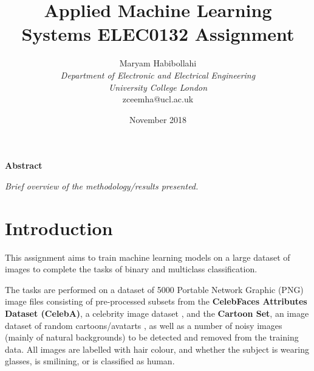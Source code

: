 \documentclass[conference]{IEEEtran}
\begin{document}
\title{Applied Machine Learning\\
 Systems ELEC0132 Assignment}
\author{\large Maryam Habibollahi\\ \textit{Department of Electronic and Electrical Engineering}\\ \textit{University College London}\\ zceemha@ucl.ac.uk}
\date{November 2018}
\maketitle

\setcounter{page}{1} 

\begin{center} \large \textbf{Abstract} \end{center}
\textit{Brief overview of the methodology/results presented.}\\

\section{Introduction} \label{s-intro}


This assignment aims to train machine learning models on a large dataset of images to complete the tasks of binary and multiclass classification.


The tasks are performed on a dataset of 5000 Portable Network Graphic (PNG) image files consisting of pre-processed subsets from the \textbf{CelebFaces Attributes Dataset (CelebA)}, a celebrity image dataset  %
, and the \textbf{Cartoon Set}, an image dataset of random cartoons/avatarts %
, as well as a number of noisy images (mainly of natural backgrounds) to be detected and removed from the training data.
All images are labelled with hair colour, and whether the subject is wearing glasses, is smilining, or is classified as human.
\end{document}
